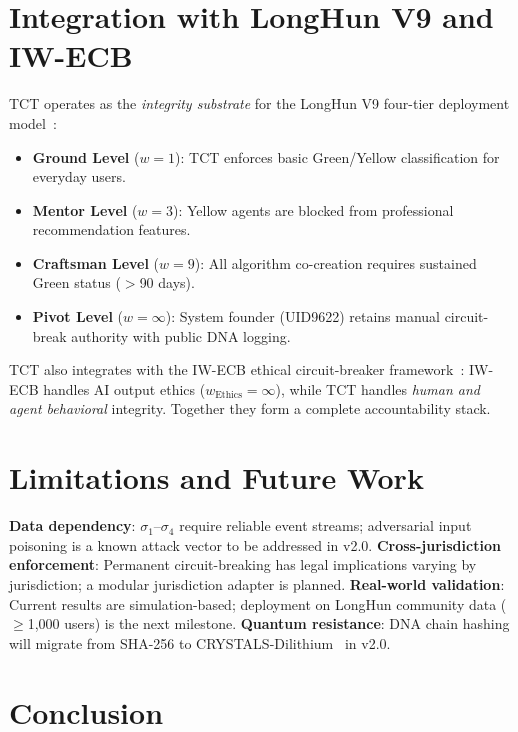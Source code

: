 \documentclass[conference]{IEEEtran}
\begin{document}
\section{Integration with LongHun V9 and IW-ECB}

TCT operates as the \emph{integrity substrate} for the LongHun V9
four-tier deployment model~\cite{UID9622-V9-2026}:
\begin{itemize}
  \item \textbf{Ground Level} ($w=1$): TCT enforces basic Green/Yellow
  classification for everyday users.
  \item \textbf{Mentor Level} ($w=3$): Yellow agents are blocked from
  professional recommendation features.
  \item \textbf{Craftsman Level} ($w=9$): All algorithm co-creation
  requires sustained Green status ($>$90 days).
  \item \textbf{Pivot Level} ($w=\infty$): System founder (UID9622)
  retains manual circuit-break authority with public DNA logging.
\end{itemize}

TCT also integrates with the IW-ECB ethical circuit-breaker
framework~\cite{UID9622-IWECB-2026}: IW-ECB handles AI output ethics
($w_\text{Ethics} = \infty$), while TCT handles \emph{human and
agent behavioral} integrity. Together they form a complete
accountability stack.

\section{Limitations and Future Work}

\textbf{Data dependency}: $\sigma_1$--$\sigma_4$ require reliable
event streams; adversarial input poisoning is a known attack
vector to be addressed in v2.0.
\textbf{Cross-jurisdiction enforcement}: Permanent circuit-breaking
has legal implications varying by jurisdiction; a modular
jurisdiction adapter is planned.
\textbf{Real-world validation}: Current results are simulation-based;
deployment on LongHun community data ($\geq$1,000 users) is the
next milestone.
\textbf{Quantum resistance}: DNA chain hashing will migrate from
SHA-256 to CRYSTALS-Dilithium~\cite{Ducas2018} in v2.0.

\section{Conclusion}
\end{document}
